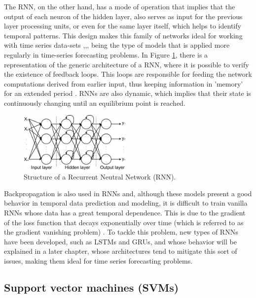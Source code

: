 The \ac{RNN}, on the other hand, has a mode of operation that implies that the output of each neuron of the hidden layer, also serves as input for the previous layer processing units, or even for the same layer itself, which helps to identify temporal patterns. This design makes this family of networks ideal for working with time series data-sets \cite{rnn1},\cite{rnn2},\cite{rnn3}, being the type of models that is applied more regularly in time-series forecasting problems. In Figure \ref{rnn}, there is a representation of the generic architecture of a \ac{RNN}, where it is possible to verify the existence of feedback loops. This loops are responsible for feeding the network computations derived from earlier input, thus keeping information in 'memory' for an extended period \cite{rnn4}. \ac{RNN}s are also dynamic, which implies that their state is continuously changing until an equilibrium point is reached. 

\begin{figure}[h!]
    \centering
    \begin{center}
    \includegraphics[width=0.49\textwidth]{Images/rnn.png}
    \caption{Structure of a Recurrent Neutral Network (RNN).}
    \label{rnn}
    \end{center}
\end{figure}



Backpropagation is also used in \ac{RNN}s and, although these models present a good behavior in temporal data prediction and modeling, it is difficult to train vanilla \ac{RNN}s whose data has a great temporal dependence. This is due to the gradient of the loss function that decays exponentially over time (which is referred to as the gradient vanishing problem) \cite{rnn4}. To tackle this problem, new types of \ac{RNN}s have been developed, such as \ac{LSTM}s and \ac{GRU}s, and whose behavior will be explained in a later chapter, whose architectures tend to mitigate this sort of issues, making them ideal for time series forecasting problems.

\subsection{Support vector machines (SVMs)}

